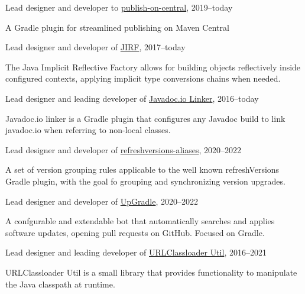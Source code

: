 \documentclass[10pt]{article}
\newenvironment{innerlist}[1][\enskip\textbullet]%
        {\begin{compactitem}[#1]}{\end{compactitem}}
\newcommand{\halfblankline}{\quad\vspace{-0.5\baselineskip}\pagebreak[3]}
\begin{document}
Lead designer and developer to \href{https://github.com/DanySK/publish-on-central}{publish-on-central}, 2019--today
\begin{innerlist}
    \item A Gradle plugin for streamlined publishing on Maven Central
\end{innerlist}
\halfblankline

Lead designer and developer of \href{https://github.com/DanySK/jirf}{JIRF}, 2017--today
\begin{innerlist}
    \item The Java Implicit Reflective Factory allows for building objects reflectively inside configured contexts, applying implicit type conversions chains when needed.
\end{innerlist}
\halfblankline

Lead designer and leading developer of \href{https://github.com/DanySK/javadoc.io-linker}{Javadoc.io Linker}, 2016--today
\begin{innerlist}
    \item Javadoc.io linker is a Gradle plugin that configures any Javadoc build to link javadoc.io when referring to non-local classes.
\end{innerlist}
\halfblankline

Lead designer and developer of \href{https://github.com/DanySK/refreshversions-aliases}{refreshversions-aliases}, 2020--2022
\begin{innerlist}
    \item A set of version grouping rules applicable to the well known refreshVersions Gradle plugin,
    with the goal fo grouping and synchronizing version upgrades.
\end{innerlist}
\halfblankline

Lead designer and developer of \href{https://github.com/DanySK/upgradle}{UpGradle}, 2020--2022
\begin{innerlist}
    \item A confgurable and extendable bot that automatically searches and applies software updates,
        opening pull requests on GitHub. Focused on Gradle.
\end{innerlist}
\halfblankline

Lead designer and leading developer of \href{https://github.com/DanySK/urlclassloader-util}{URLClassloader Util}, 2016--2021
\begin{innerlist}
    \item URLClassloader Util is a small library that provides functionality to manipulate the Java classpath at runtime.
\end{innerlist}
\halfblankline
\end{document}
